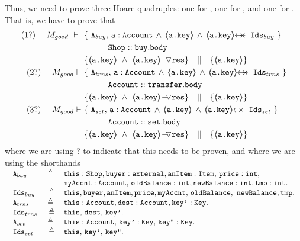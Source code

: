 \begin{proofO}
\normalsize
Thus, we need to prove  three Hoare quadruples: one for , one for  , and one for  .  That is, we have to prove that
 \small
\begin{align*}
\text{(1?)}  \ \ \ \ M_{good}\ \vdash  \  \ 
		&	\{  \ \Alocals, \, \prg{a}:\prg{Account} \, \wedge\, {\inside{\prg{a.key}}} \, \wedge \, \protectedFrom {\prg{a.key}} {\Ids}  \  \} \\
		& \SPT \prg{Shop}::\prg{buy}.\prg{body}\ \\  
		& \{ {\inside{\prg{a.key}}}\ \wedge\ {\PushASLong {\prg{res}} {\inside{\prg{a.key}}}}  \} \ \ \  || \ \ \ 
		   \{ {\inside{\prg{a.key}}} \}
\\
\text{(2?)}  \ \ \ \ M_{good} \vdash \ 
		&	\{  \ \Alocalstr, \, \prg{a}:\prg{Account}\, \wedge\,  {\inside{\prg{a.key}}} \, \wedge \, \protectedFrom {\prg{a.key}} {\Idstr}  \  \} \\
		& \SPT \prg{Account}::\prg{transfer}.\prg{body}\ \\  
		& \{ {\inside{\prg{a.key}}}\ \wedge\ {\PushASLong {\prg{res}} {\inside{\prg{a.key}}}}  \} \ \ \  || \ \ \ 
		   \{ {\inside{\prg{a.key}}} \}
\\
\text{(3?)}  \ \ \ \ M_{good} \vdash \ 
		&	\{  \ \Alocalsset, \, \prg{a}:\prg{Account}\, \wedge\,  {\inside{\prg{a.key}}} \, \wedge \, \protectedFrom {\prg{a.key}} {\Idsset}  \  \} \\
		& \SPT \prg{Account}::\prg{set}.\prg{body}\ \\  
		& \{ {\inside{\prg{a.key}}}\ \wedge\ {\PushASLong {\prg{res}} {\inside{\prg{a.key}}}}  \} \ \ \  || \ \ \ 
		   \{ {\inside{\prg{a.key}}} \}
\end{align*}
\normalsize
where we are using ? to indicate that this needs to be proven, and 
where we are using the shorthands\\
\small
$
\begin{array}{c}
\begin{array}{lcl}
 \mbox{\normalfont{\texttt{A}}}_{buy}\ &  \triangleq   \  &   \mbox{\normalfont{\texttt{this}}}:\mbox{\normalfont{\texttt{Shop}}}, \mbox{\normalfont{\texttt{buyer}}} : \mbox{\normalfont{\texttt{external}}}, \mbox{\normalfont{\texttt{anItem}}} : \mbox{\normalfont{\texttt{Item}}},\, \mbox{\normalfont{\texttt{price}}} : \mbox{\normalfont{\texttt{int}}},  \\
&  & \mbox{\normalfont{\texttt{myAccnt}}} : \mbox{\normalfont{\texttt{Account}}},\, \mbox{\normalfont{\texttt{oldBalance}}}:  \mbox{\normalfont{\texttt{int}}},  \mbox{\normalfont{\texttt{newBalance}}}:  \mbox{\normalfont{\texttt{int}}},  \mbox{\normalfont{\texttt{tmp}}}:  \mbox{\normalfont{\texttt{int}}}.\\
  \mbox{\normalfont{\texttt{Ids}}}_{buy}\ &   \triangleq   & \mbox{\normalfont{\texttt{this}}},  \mbox{\normalfont{\texttt{buyer}}}, \mbox{\normalfont{\texttt{anItem}}}, \mbox{\normalfont{\texttt{price}}}, \mbox{\normalfont{\texttt{myAccnt}}},\, \mbox{\normalfont{\texttt{oldBalance}}},\  \mbox{\normalfont{\texttt{newBalance}}},  \mbox{\normalfont{\texttt{tmp}}}.\\ 
\mbox{\normalfont{\texttt{A}}}_{trns}\  & \triangleq \  &   \mbox{\normalfont{\texttt{this}}}:\mbox{\normalfont{\texttt{Account}}}, \mbox{\normalfont{\texttt{dest}}} : \mbox{\normalfont{\texttt{Account}}}, \mbox{\normalfont{\texttt{key'}}} : \mbox{\normalfont{\texttt{Key}}}. \\
  \mbox{\normalfont{\texttt{Ids}}}_{trns}\  &  \triangleq  & \mbox{\normalfont{\texttt{this}}},\, \mbox{\normalfont{\texttt{dest}}} ,\, \mbox{\normalfont{\texttt{key'}}}. \\
  \mbox{\normalfont{\texttt{A}}}_{set}\  & \triangleq \  &   \mbox{\normalfont{\texttt{this}}}:\mbox{\normalfont{\texttt{Account}}}, \, \mbox{\normalfont{\texttt{key'}}} : \mbox{\normalfont{\texttt{Key}}},\, \mbox{\normalfont{\texttt{key''}}} : \mbox{\normalfont{\texttt{Key}}}.\\
    \mbox{\normalfont{\texttt{Ids}}}_{set}\  &  \triangleq  & \mbox{\normalfont{\texttt{this}}},\, \mbox{\normalfont{\texttt{key'}}} ,\, \mbox{\normalfont{\texttt{key''}}}. \\
\end{array}
\end{array}
$
\normalsize


\end{proofO}
